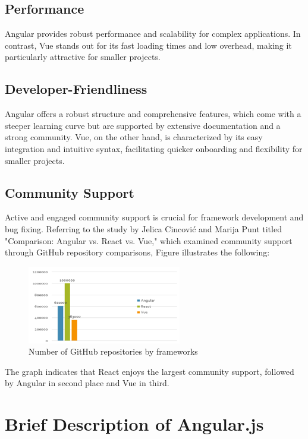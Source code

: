\subsection{Performance}
Angular provides robust performance and scalability for complex applications. In contrast, Vue stands out for its fast loading times and low overhead, making it particularly attractive for smaller projects. \cite{verma2022comparison}

\subsection{Developer-Friendliness}
Angular offers a robust structure and comprehensive features, which come with a steeper learning curve but are supported by extensive documentation and a strong community. Vue, on the other hand, is characterized by its easy integration and intuitive syntax, facilitating quicker onboarding and flexibility for smaller projects. \cite{angular, vue}

\subsection{Community Support}
Active and engaged community support is crucial for framework development and bug fixing. Referring to the study by Jelica Cincović and Marija Punt titled "Comparison: Angular vs. React vs. Vue," which examined community support through GitHub repository comparisons, Figure  illustrates the following:


\begin{figure}[h]
    \centering
    \includegraphics[width=0.6\textwidth]{image.png}
    \caption{Number of GitHub repositories by frameworks}
    \label{fig:github_repos}
\end{figure}

The graph indicates that React enjoys the largest community support, followed by Angular in second place and Vue in third. \cite{cincovic2020comparison}

\section{Brief Description of Angular.js}

